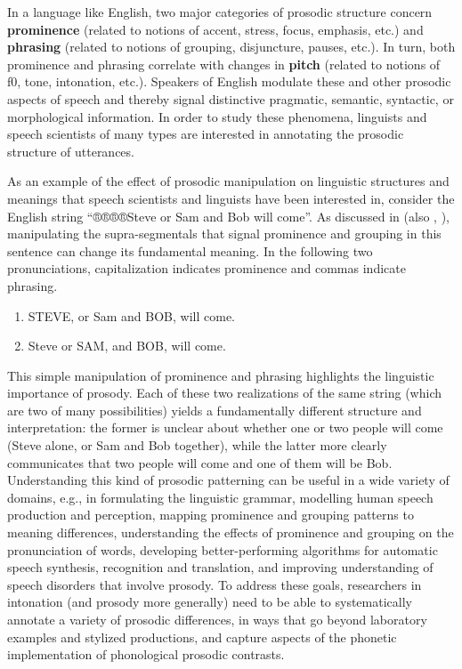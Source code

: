 \documentclass[11pt, twoside]{memoir}
\begin{document}
In a language like English, two major categories of prosodic structure concern \textbf{prominence} (related to notions of accent, stress, focus, emphasis, etc.) and \textbf{phrasing} (related to notions of grouping, disjuncture, pauses, etc.). In turn, both prominence and phrasing correlate with changes in \textbf{pitch} (related to notions of f0, tone, intonation, etc.). Speakers of English modulate these and other prosodic aspects of speech and thereby signal distinctive pragmatic, semantic, syntactic, or morphological information. In order to study these phenomena, linguists and speech scientists of many types are interested in annotating the prosodic structure of utterances.

As an example of the effect of prosodic manipulation on linguistic structures and meanings that speech scientists and linguists have been interested in, consider the English string “®®®®{Steve or Sam and Bob will come}”. As discussed in \citealt{lehiste73} (also \citealt{price-91}, \citealt{veilleux-06}), manipulating the supra-segmentals that signal prominence and grouping in this sentence can change its fundamental meaning. In the following two pronunciations, capitalization indicates prominence and commas indicate phrasing.

\begin{enumerate} \def\labelenumi{\arabic{enumi}.}
\item STEVE, or Sam and BOB, will come.
\item Steve or SAM, and BOB, will come. \end{enumerate}

This simple manipulation of prominence and phrasing highlights the linguistic importance of prosody. Each of these two realizations of the same string (which are two of many possibilities) yields a fundamentally different structure and interpretation: the former is unclear about whether one or two people will come (Steve alone, or Sam and Bob together), while the latter more clearly communicates that two people will come and one of them will be Bob. Understanding this kind of prosodic patterning can be useful in a wide variety of domains, e.g., in formulating the linguistic grammar, modelling human speech production and perception, mapping prominence and grouping patterns to meaning differences, understanding the effects of prominence and grouping on the pronunciation of words, developing better-performing algorithms for automatic speech synthesis, recognition and translation, and improving understanding of speech disorders that involve prosody. To address these goals, researchers in intonation (and prosody more generally) need to be able to systematically annotate a variety of prosodic differences, in ways that go beyond laboratory examples and stylized productions, and capture aspects of the phonetic implementation of phonological prosodic contrasts.
\end{document}

